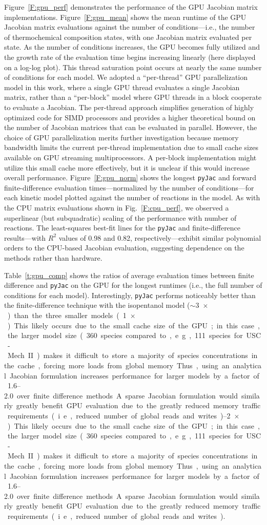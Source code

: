 \documentclass[preprint,12pt]{elsarticle}
\begin{document}
{Figure~\ref{F:gpu_perf} demonstrates the performance of the GPU Jacobian matrix implementations.
Figure~\ref{F:gpu_mean} shows the mean runtime of the GPU Jacobian matrix evaluations against the number of conditions---i.e., the number of thermochemical composition states, with one Jacobian matrix evaluated per state.
As the number of conditions increases, the GPU becomes fully utilized and the growth rate of the evaluation time begins increasing linearly (here displayed on a log-log plot).
This thread saturation point occurs at nearly the same number of conditions for each model.
We adopted a ``per-thread'' GPU parallelization model in this work, where a single GPU thread evaluates a single Jacobian matrix, rather than a ``per-block'' model where GPU threads in a block cooperate to evaluate a Jacobian.
The per-thread approach simplifies generation of highly optimized code for SIMD processors and provides a higher theoretical bound on the number of Jacobian matrices that can be evaluated in parallel.
However, the choice of GPU parallelization merits further investigation because memory bandwidth limits the current per-thread implementation due to small cache sizes available on GPU streaming multiprocessors.
A per-block implementation might utilize this small cache more effectively, but it is unclear if this would increase overall performance.
Figure~\ref{F:gpu_norm} shows the longest \texttt{pyJac} and forward finite-difference evaluation times---normalized by the number of conditions---for each kinetic model plotted against the number of reactions in the model.
As with the CPU matrix evaluations shown in Fig.~\ref{F:cpu_perf}, we observed a superlinear (but subquadratic) scaling of the performance with number of reactions.
The least-squares best-fit lines for the \texttt{pyJac} and finite-difference results---with $R^2$ values of 0.98 and 0.82, respectively---exhibit similar polynomial orders to the CPU-based Jacobian evaluation, suggesting dependence on the methods rather than hardware.

Table~\ref{t:gpu_comp} shows the ratios of average evaluation times between finite difference and \texttt{pyJac} on the GPU for the longest runtimes (i.e., the full number of conditions for each model).
Interestingly, \texttt{pyJac} performs noticeably better than the finite-difference technique with the isopentanol model ($\sim$\SI{3}{$\times$}) than the three smaller models (\SIrange{1}{2}{$\times$}).
This likely occurs due to the small cache size of the GPU; in this case, the larger model size (360 species compared to, e.g., 111 species for USC-Mech II) makes it difficult to store a majority of species concentrations in the cache, forcing more loads from global memory.
Thus, using an analytical Jacobian formulation increases performance for larger models by a factor of \numrange{1.6}{2.0} over finite difference methods.
A sparse Jacobian formulation would similarly greatly benefit GPU evaluation due to the greatly reduced memory traffic requirements (i.e., reduced number of global reads and writes).

}
\end{document}
